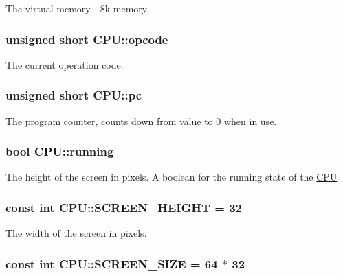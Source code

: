 The virtual memory -\/ 8k memory \hypertarget{classCPU_a494cb1c2ba6ce16e3a900eaf7b1a5f63}{
\subsubsection[{opcode}]{\setlength{\rightskip}{0pt plus 5cm}unsigned short C\-P\-U\-::opcode\hspace{0.3cm}{\ttfamily [private]}}}\label{classCPU_a494cb1c2ba6ce16e3a900eaf7b1a5f63}
The current operation code. \hypertarget{classCPU_a7ebf891c17b973e7aa4b1c2164dcab53}{
\subsubsection[{pc}]{\setlength{\rightskip}{0pt plus 5cm}unsigned short C\-P\-U\-::pc\hspace{0.3cm}{\ttfamily [private]}}}\label{classCPU_a7ebf891c17b973e7aa4b1c2164dcab53}
The program counter, counts down from value to 0 when in use. \hypertarget{classCPU_ac13fd4e7e628ad487d6b7c9573c51a09}{
\subsubsection[{running}]{\setlength{\rightskip}{0pt plus 5cm}bool C\-P\-U\-::running}}\label{classCPU_ac13fd4e7e628ad487d6b7c9573c51a09}
The height of the screen in pixels. A boolean for the running state of the \hyperlink{classCPU}{C\-P\-U} \hypertarget{classCPU_a0c73376f8f7ed2cdcdc97967433e23b7}{
\subsubsection[{S\-C\-R\-E\-E\-N\-\_\-\-H\-E\-I\-G\-H\-T}]{\setlength{\rightskip}{0pt plus 5cm}const int C\-P\-U\-::\-S\-C\-R\-E\-E\-N\-\_\-\-H\-E\-I\-G\-H\-T = 32\hspace{0.3cm}{\ttfamily [static]}}}\label{classCPU_a0c73376f8f7ed2cdcdc97967433e23b7}
The width of the screen in pixels. \hypertarget{classCPU_a06c3d3ec8c47f48c437256e8910840a1}{
\subsubsection[{S\-C\-R\-E\-E\-N\-\_\-\-S\-I\-Z\-E}]{\setlength{\rightskip}{0pt plus 5cm}const int C\-P\-U\-::\-S\-C\-R\-E\-E\-N\-\_\-\-S\-I\-Z\-E = 64 $\ast$ 32\hspace{0.3cm}{\ttfamily [static]}}}\label{classCPU_a06c3d3ec8c47f48c437256e8910840a1}
